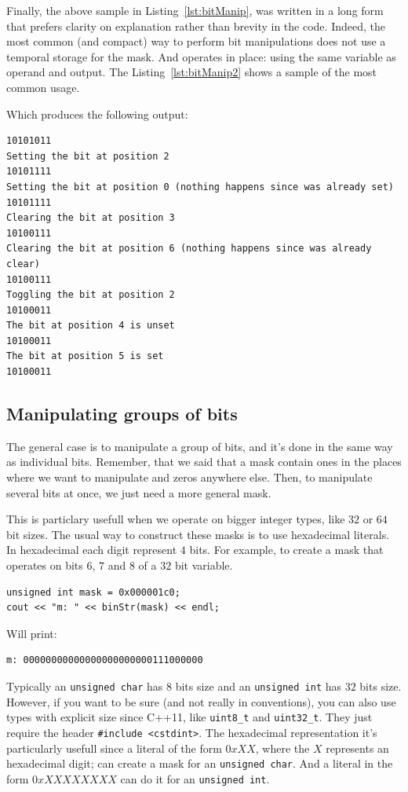 Finally, the above sample in Listing~\ref{lst:bitManip}, was written in a long form that prefers clarity on explanation rather than brevity in the code.
Indeed, the most common (and compact) way to perform bit manipulations does not use a temporal storage for the mask.
And operates in place: using the same variable as operand and output.
The Listing~\ref{lst:bitManip2} shows a sample of the most common usage.



Which produces the following output:
\begin{verbatim}
10101011
Setting the bit at position 2
10101111
Setting the bit at position 0 (nothing happens since was already set)
10101111
Clearing the bit at position 3
10100111
Clearing the bit at position 6 (nothing happens since was already clear)
10100111
Toggling the bit at position 2
10100011
The bit at position 4 is unset
10100011
The bit at position 5 is set
10100011  
\end{verbatim}

\subsection{Manipulating groups of bits}

The general case is to manipulate a group of bits, and it's done in the same way as individual bits.
Remember, that we said that a mask contain ones in the places where we want to manipulate and zeros anywhere else.
Then, to manipulate several bits at once, we just need a more general mask.

This is particlary usefull when we operate on bigger integer types, like $32$ or $64$ bit sizes.
The usual way to construct these masks is to use hexadecimal literals.
In hexadecimal each digit represent $4$ bits.
For example, to create a mask that operates on bits $6$, $7$ and $8$ of a $32$ bit variable. 

\begin{verbatim}
unsigned int mask = 0x000001c0;
cout << "m: " << binStr(mask) << endl;
\end{verbatim}

Will print:
\begin{verbatim}
m: 00000000000000000000000111000000
\end{verbatim}

Typically an \texttt{unsigned char} has $8$ bits size and an \texttt{unsigned int} has $32$ bits size.
However, if you want to be sure (and not really in conventions), you can also use types with explicit size since C++11, like \texttt{uint8_t} and \texttt{uint32_t}.
They just require the header \texttt{#include <cstdint>}. 
The hexadecimal representation it's particularly usefull since a literal of the form $0xXX$, where the $X$ represents an hexadecimal digit; can create a mask for an \texttt{unsigned char}.
And a literal in the form $0xXXXXXXXX$ can do it for an \texttt{unsigned int}.
